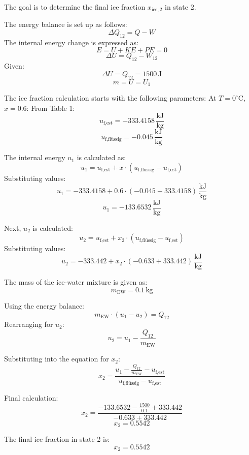 The goal is to determine the final ice fraction \( x_{\text{ice},2} \) in state 2.  

The energy balance is set up as follows:  
\[
\Delta Q_{12} = Q - W
\]  
The internal energy change is expressed as:  
\[
E = U + KE + PE = 0
\]  
\[
\Delta U = Q_{12} - W_{12}
\]  
Given:  
\[
\Delta U = Q_{12} = 1500 \, \text{J}
\]  
\[
m = U = U_1
\]  

The ice fraction calculation starts with the following parameters:  
At \( T = 0^\circ \text{C} \), \( x = 0.6 \):  
From Table 1:  
\[
u_{\text{f,est}} = -333.4158 \, \frac{\text{kJ}}{\text{kg}}
\]  
\[
u_{\text{f,flüssig}} = -0.045 \, \frac{\text{kJ}}{\text{kg}}
\]  

The internal energy \( u_1 \) is calculated as:  
\[
u_1 = u_{\text{f,est}} + x \cdot (u_{\text{f,flüssig}} - u_{\text{f,est}})
\]  
Substituting values:  
\[
u_1 = -333.4158 + 0.6 \cdot (-0.045 + 333.4158) \, \frac{\text{kJ}}{\text{kg}}
\]  
\[
u_1 = -133.6532 \, \frac{\text{kJ}}{\text{kg}}
\]  

Next, \( u_2 \) is calculated:  
\[
u_2 = u_{\text{f,est}} + x_2 \cdot (u_{\text{f,flüssig}} - u_{\text{f,est}})
\]  
Substituting values:  
\[
u_2 = -333.442 + x_2 \cdot (-0.633 + 333.442) \, \frac{\text{kJ}}{\text{kg}}
\]  

The mass of the ice-water mixture is given as:  
\[
m_{\text{EW}} = 0.1 \, \text{kg}
\]  

Using the energy balance:  
\[
m_{\text{EW}} \cdot (u_1 - u_2) = Q_{12}
\]  
Rearranging for \( u_2 \):  
\[
u_2 = u_1 - \frac{Q_{12}}{m_{\text{EW}}}
\]  

Substituting into the equation for \( x_2 \):  
\[
x_2 = \frac{u_1 - \frac{Q_{12}}{m_{\text{EW}}} - u_{\text{f,est}}}{u_{\text{f,flüssig}} - u_{\text{f,est}}}
\]  

Final calculation:  
\[
x_2 = \frac{-133.6532 - \frac{1500}{0.1} + 333.442}{-0.633 + 333.442}
\]  
\[
x_2 = 0.5542
\]  

The final ice fraction in state 2 is:  
\[
x_2 = 0.5542
\]